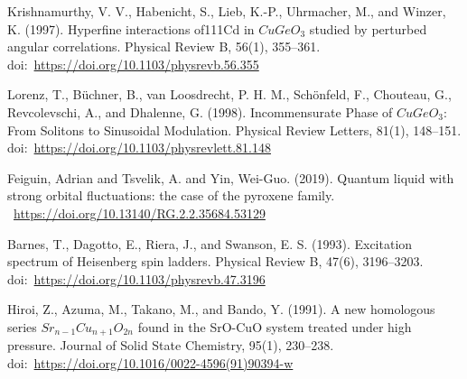 \documentclass[11pt]{article}
\begin{document}
\begin{thebibliography}{3}
Krishnamurthy, V. V., Habenicht, S., Lieb, K.-P., Uhrmacher, M., and Winzer, K. (1997). Hyperfine interactions of111Cd in $CuGeO_3$ studied by perturbed angular correlations. Physical Review B, 56(1), 355–361. doi:~\url{https://doi.org/10.1103/physrevb.56.355} 

Lorenz, T., Büchner, B., van Loosdrecht, P. H. M., Schönfeld, F., Chouteau, G., Revcolevschi, A., and Dhalenne, G. (1998). Incommensurate Phase of $CuGeO_3$: From Solitons to Sinusoidal Modulation. Physical Review Letters, 81(1), 148–151. doi:~\url{https://doi.org/10.1103/physrevlett.81.148} 

Feiguin, Adrian and Tsvelik, A. and Yin, Wei-Guo. (2019). Quantum liquid with strong orbital fluctuations: the case of the pyroxene family. ~\url{https://doi.org/10.13140/RG.2.2.35684.53129}

Barnes, T., Dagotto, E., Riera, J., and Swanson, E. S. (1993). Excitation spectrum of Heisenberg spin ladders. Physical Review B, 47(6), 3196–3203. doi:~\url{https://doi.org/10.1103/physrevb.47.3196}

Hiroi, Z., Azuma, M., Takano, M., and Bando, Y. (1991). A new homologous series $Sr_{n−1}Cu_{n+1}O_{2n}$ found in the SrO-CuO system treated under high pressure. Journal of Solid State Chemistry, 95(1), 230–238. doi:~\url{https://doi.org/10.1016/0022-4596(91)90394-w}


\end{thebibliography}
\end{document}

